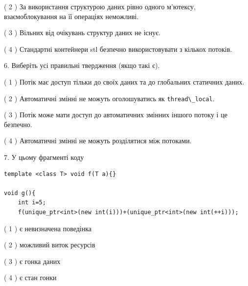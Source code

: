 \documentclass[12pt, ukrainian]{article}
\def\code#1{\Verb!#1!}
\begin{document}
\begin {large}
{( 2 ) За використання структурою даних рівно одного м’ютексу, взаємоблокування на її операціях неможливі.%

( 3 ) Вільних від очікувань структур даних не існує.%

( 4 ) Стандартні контейнери stl безпечно використовувати з кількох потоків.%
\newpage



\vspace{5mm}
6. Виберіть усі правильні твердження (якщо такі є).\par
\vspace{2mm}

( 1 ) Потік має доступ тільки до своїх даних та до глобальних статичних даних.%

( 2 ) Автоматичні змінні не можуть оголошуватись як \code{thread\_local}.%

( 3 ) Потік може мати доступ до автоматичних змінних іншого потоку і це безпечно.%

( 4 ) Автоматичні змінні не можуть розділятися між потоками.%


\vspace{5mm}
7. У цьому фрагменті коду
\begin{verbatim}
template <class T> void f(T a){}

void g(){
    int i=5;
    f(unique_ptr<int>(new int(i)))+(unique_ptr<int>(new int(++i)));
\end{verbatim}
( 1 ) є невизначена поведінка%

( 2 ) можливий виток ресурсів%

( 3 ) є гонка даних%

( 4 ) є стан гонки%
}
\end {large}
\end{document}
